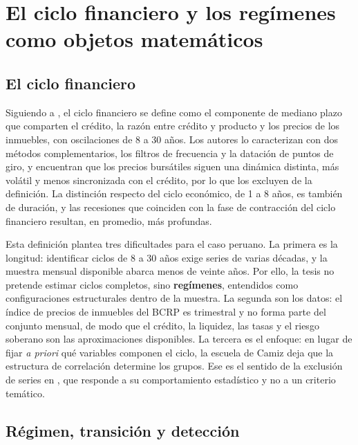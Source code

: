 \section{El ciclo financiero y los regímenes como objetos matemáticos}
\label{sec:ciclo}

\subsection{El ciclo financiero}

Siguiendo a \textcite{drehmann_borio_tsatsaronis_2012}, el ciclo financiero se define como el
componente de mediano plazo que comparten el crédito, la razón entre crédito y producto y los
precios de los inmuebles, con oscilaciones de 8 a 30 años. Los autores lo caracterizan con dos
métodos complementarios, los filtros de frecuencia y la datación de puntos de giro, y encuentran
que los precios bursátiles siguen una dinámica distinta, más volátil y menos sincronizada con el
crédito, por lo que los excluyen de la definición. La distinción respecto del ciclo económico, de
1 a 8 años, es también de duración, y las recesiones que coinciden con la fase de contracción del
ciclo financiero resultan, en promedio, más profundas.

Esta definición plantea tres dificultades para el caso peruano. La primera es la longitud:
identificar ciclos de 8 a 30 años exige series de varias décadas, y la muestra mensual disponible
abarca menos de veinte años. Por ello, la tesis no pretende estimar ciclos completos, sino
\textbf{regímenes}, entendidos como configuraciones estructurales dentro de la muestra. La
segunda son los datos: el índice de precios de inmuebles del BCRP es trimestral y no forma parte
del conjunto mensual, de modo que el crédito, la liquidez, las tasas y el riesgo soberano son las
aproximaciones disponibles. La tercera es el enfoque: en lugar de fijar \emph{a priori} qué
variables componen el ciclo, la escuela de Camiz deja que la estructura de correlación determine
los grupos. Ese es el sentido de la exclusión de series en \textcite{camiz_cerda_atoche_2026},
que responde a su comportamiento estadístico y no a un criterio temático.

\subsection{Régimen, transición y detección}
\label{sec:regimen}

